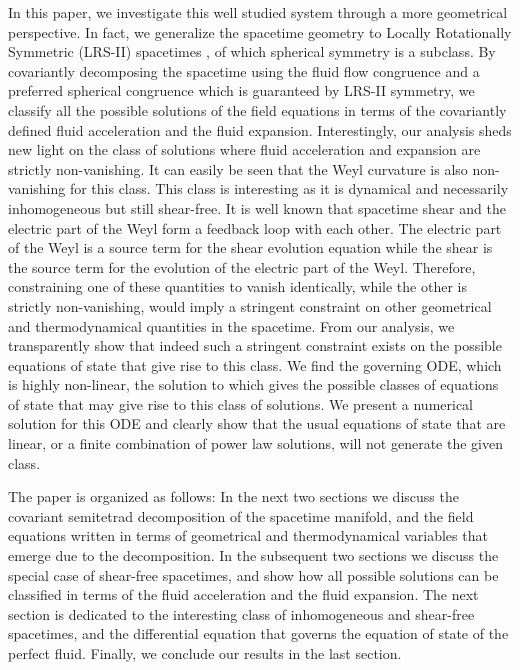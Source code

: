 \documentclass[abstract=on,notitlepage,superscriptaddress,nofootinbib,aps,preprint,prd]{revtex4}
\newcommand{\0}{^{(0)}}
\newcommand{\1}{^{(1)}}
\newcommand{\2}{^{(2)}}
\newcommand{\3}{{}^{(3)}}
\begin{document}
In this paper, we investigate this well studied system through a more geometrical perspective. In fact, we generalize the spacetime geometry to Locally Rotationally Symmetric (LRS-II) spacetimes \cite{vanElstEllis}, of which spherical symmetry is a subclass. By covariantly decomposing the spacetime using the fluid flow congruence and a preferred spherical congruence which is guaranteed by LRS-II symmetry, we classify all the possible solutions of the field equations in terms of the covariantly defined fluid acceleration and the fluid expansion. Interestingly, our analysis sheds new light on the class of solutions where fluid acceleration and expansion are strictly non-vanishing. It can easily be seen that the Weyl curvature is also non-vanishing for this class. This class is interesting as it is dynamical and necessarily inhomogeneous but still shear-free. It is well known that spacetime shear and the electric part of the Weyl form a feedback loop with each other. The electric part of the Weyl is a source term for the shear evolution equation while the shear is the source term for the evolution of the electric part of the Weyl. Therefore, constraining one of these quantities to vanish identically, while the other is strictly non-vanishing, would imply a stringent constraint on other geometrical and thermodynamical quantities in the spacetime. From our analysis, we transparently show that indeed such a stringent constraint exists on the possible equations of state that give rise to this class. We find the governing ODE, which is highly non-linear, the solution to which gives the possible classes of equations of state that may give rise to this class of solutions. We present a numerical solution for this ODE and clearly show that the usual equations of state that are linear, or a finite combination of power law solutions, will not generate the given class. 

The paper is organized as follows: In the next two sections we discuss the covariant semitetrad decomposition of the spacetime manifold, and the field equations written in terms of geometrical and thermodynamical variables that emerge due to the decomposition. In the subsequent two sections we discuss the special case of shear-free spacetimes, and show how all possible solutions can be classified in terms of the fluid acceleration and the fluid expansion. The next section is dedicated to the interesting class of inhomogeneous and shear-free spacetimes, and the differential equation that governs the equation of state of the perfect fluid. Finally, we conclude our results in the last section. 
\end{document}
